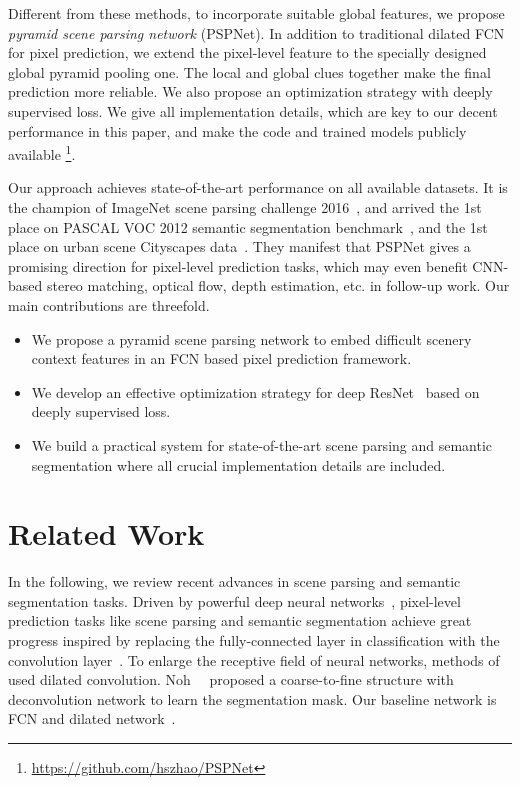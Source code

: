 \documentclass[10pt,twocolumn,letterpaper]{article}
\begin{document}
Different from these methods, to incorporate suitable global features, we propose {\it
pyramid scene parsing network} (PSPNet). In addition to traditional dilated FCN
\cite{chen2014semantic,yu2015multi} for pixel prediction, we extend the pixel-level
feature to the specially designed global pyramid pooling one. The local and global clues
together make the final prediction more reliable. We also propose an optimization
strategy with deeply supervised loss. We give all implementation details, which are key
to our decent performance in this paper, and make the code and trained models publicly
available
\footnote{\href{https://github.com/hszhao/PSPNet}{https://github.com/hszhao/PSPNet}}.

Our approach achieves state-of-the-art performance on all available datasets. It is the
champion of ImageNet scene parsing challenge 2016~\cite{zhou2016semantic}, and arrived
the 1st place on PASCAL VOC 2012 semantic segmentation
benchmark~\cite{everingham2010pascal}, and the 1st place on urban scene Cityscapes
data~\cite{cordts2016cityscapes}. They manifest that PSPNet gives a promising direction
for pixel-level prediction tasks, which may even benefit CNN-based stereo matching,
optical flow, depth estimation, etc. in follow-up work. Our main contributions are
threefold.
\begin{itemize}
\vspace{-0.1cm}
\item 
We propose a pyramid scene parsing network to embed difficult scenery context features in
an FCN based pixel prediction framework. \vspace{-0.1cm}
\item 
We develop an effective optimization strategy for deep ResNet~\cite{he2015deep} based on
deeply supervised loss. \vspace{-0.1cm}
\item 
We build a practical system for state-of-the-art scene parsing and semantic segmentation
where all crucial implementation details are included.
\end{itemize}

\section{Related Work}

In the following, we review recent advances in scene parsing and semantic segmentation
tasks. Driven by powerful deep neural
networks~\cite{krizhevsky2012imagenet,simonyan2014very,szegedy2015going,he2015deep},
pixel-level prediction tasks like scene parsing and semantic segmentation achieve great
progress inspired by replacing the fully-connected layer in classification with the
convolution layer~\cite{long2015fully}. To enlarge the receptive field of neural
networks, methods of~\cite{chen2014semantic,yu2015multi} used dilated convolution.
Noh~\etal~\cite{noh2015learning} proposed a coarse-to-fine structure with deconvolution
network to learn the segmentation mask. Our baseline network is FCN and dilated
network~\cite{long2015fully,chen2014semantic}.
\end{document}
